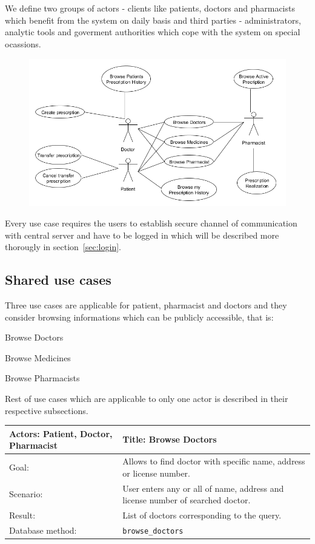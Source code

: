
\chapter {}
We define two groups of actors - clients like patients, doctors and pharmacists which benefit from the system on daily basis and third parties - administrators, analytic tools and goverment authorities which cope with the system on special ocassions.

\begin{figure}[h]
\centering
\includegraphics[width=1\textwidth]{database/standardUseCases.png}
\end{figure} 

Every use case requires the users to establish secure channel of communication with central server and have to be logged in which will be described more thorougly in section~\ref{sec:login}.
\section{Shared use cases}

Three use cases are applicable for patient, pharmacist and doctors and they consider browsing informations which can be publicly accessible, that is:
\begin{packed_enum}
\item Browse Doctors
\item Browse Medicines 
\item Browse Pharmacists
\end{packed_enum}
Rest of use cases which are applicable to only one actor is described in their respective subsections.
\small
\begin{longtable}{|p{6cm}|p{7.75cm}|}
   
    \hline
    Actors: Patient, Doctor, Pharmacist &Title: Browse Doctors \\ \hline
    Goal: & Allows to find doctor with specific name, address or license number. \\ \hline
    Scenario: & User enters any or all of name, address and license number of searched doctor. \\ \hline
    Result: & List of doctors corresponding to the query. \\ \hline
    Database  method: & \texttt{browse\_doctors} \\ \hline
    
\end{longtable}

